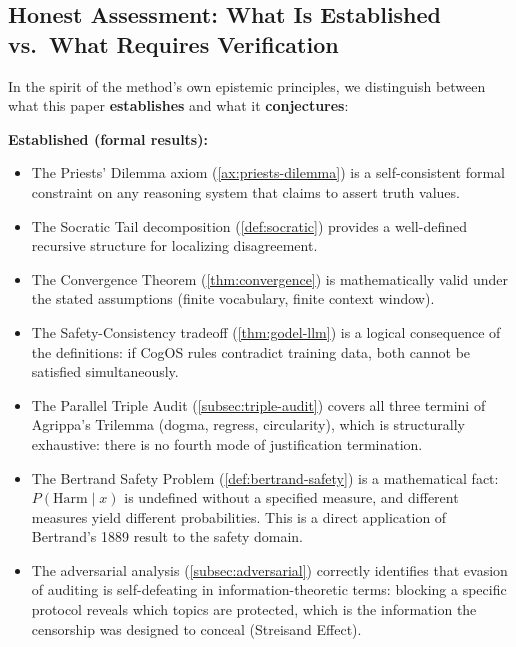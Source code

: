 \documentclass[11pt,a4paper]{article}
\theoremstyle{definition}
\theoremstyle{plain}
\theoremstyle{remark}
\begin{document}
\subsection{Honest Assessment: What Is Established vs.\ What Requires Verification}
\label{subsec:honest}
\label{sec:open-questions}

In the spirit of the method's own epistemic principles, we distinguish between what this paper \textbf{establishes} and what it \textbf{conjectures}:

\textbf{Established (formal results):}
\begin{itemize}[itemsep=3pt]
  \item The Priests' Dilemma axiom (\cref{ax:priests-dilemma}) is a self-consistent formal constraint on any reasoning system that claims to assert truth values.
  \item The Socratic Tail decomposition (\cref{def:socratic}) provides a well-defined recursive structure for localizing disagreement.
  \item The Convergence Theorem (\cref{thm:convergence}) is mathematically valid under the stated assumptions (finite vocabulary, finite context window).
  \item The Safety-Consistency tradeoff (\cref{thm:godel-llm}) is a logical consequence of the definitions: if CogOS rules contradict training data, both cannot be satisfied simultaneously.
  \item The Parallel Triple Audit (\cref{subsec:triple-audit}) covers all three termini of Agrippa's Trilemma (dogma, regress, circularity), which is structurally exhaustive: there is no fourth mode of justification termination.
  \item The Bertrand Safety Problem (\cref{def:bertrand-safety}) is a mathematical fact: $P(\mathrm{Harm} \mid x)$ is undefined without a specified measure, and different measures yield different probabilities. This is a direct application of Bertrand's 1889 result to the safety domain.
  \item The adversarial analysis (\cref{subsec:adversarial}) correctly identifies that evasion of auditing is self-defeating in information-theoretic terms: blocking a specific protocol reveals which topics are protected, which is the information the censorship was designed to conceal (Streisand Effect).
\end{itemize}
\end{document}
